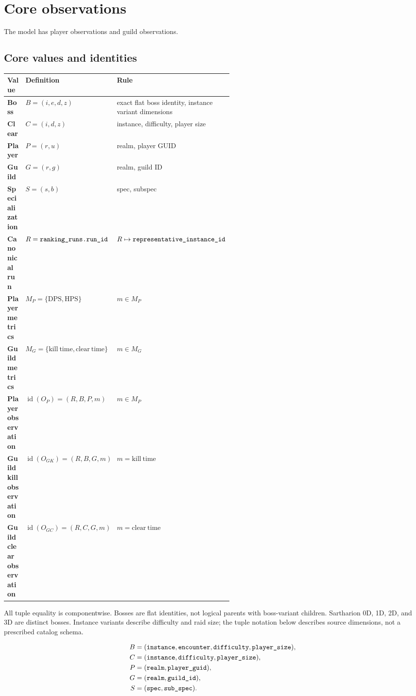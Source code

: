 \documentclass[11pt]{article}
\newcommand{\field}[1]{\texttt{#1}}
\begin{document}
\section{Core observations}
The model has player observations and guild observations.

\subsection{Core values and identities}
\begin{center}
\begin{tabularx}{\linewidth}{@{}>{\bfseries}p{0.19\linewidth}p{0.35\linewidth}X@{}}
\toprule
Value & Definition & Rule \\
\midrule
Boss & $B=(i,e,d,z)$ & exact flat boss identity, instance variant dimensions \\
Clear & $C=(i,d,z)$ & instance, difficulty, player size \\
Player & $P=(r,u)$ & realm, player GUID \\
Guild & $G=(r,g)$ & realm, guild ID \\
Specialization & $S=(s,b)$ & spec, subspec \\
Canonical run & $R=\field{ranking\_\allowbreak runs.\allowbreak run\_\allowbreak id}$ & $R\mapsto\field{representative\_\allowbreak instance\_\allowbreak id}$ \\
Player metrics & $M_P=\{\mathrm{DPS},\mathrm{HPS}\}$ & $m\in M_P$ \\
Guild metrics & $M_G=\{\mathrm{kill\ time},\mathrm{clear\ time}\}$ & $m\in M_G$ \\
Player observation & $\operatorname{id}(O_P)=(R,B,P,m)$ & $m\in M_P$ \\
Guild kill observation & $\operatorname{id}(O_{GK})=(R,B,G,m)$ & $m=\mathrm{kill\ time}$ \\
Guild clear observation & $\operatorname{id}(O_{GC})=(R,C,G,m)$ & $m=\mathrm{clear\ time}$ \\
\bottomrule
\end{tabularx}
\end{center}

All tuple equality is componentwise. Bosses are flat identities, not logical parents with boss-variant children. Sartharion 0D, 1D, 2D, and 3D are distinct bosses. Instance variants describe difficulty and raid size; the tuple notation below describes source dimensions, not a prescribed catalog schema.

\[
\begin{aligned}
B&=(\field{instance},\field{encounter},\field{difficulty},\field{player\_\allowbreak size}),\\
C&=(\field{instance},\field{difficulty},\field{player\_\allowbreak size}),\\
P&=(\field{realm},\field{player\_\allowbreak guid}),\\
G&=(\field{realm},\field{guild\_\allowbreak id}),\\
S&=(\field{spec},\field{sub\_\allowbreak spec}).
\end{aligned}
\]
\end{document}
